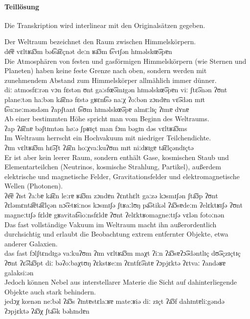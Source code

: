 
\paragraph*{Teillösung}

Die Transkription wird interlinear mit den Originalsätzen gegeben.

\begin{exe}
  \ex \gll Der Weltraum bezeichnet den Raum zwischen Himmelskörpern.\\
  de͡ɐ vɛltʁa͡ɔm bət͡sa͡ɛçnət deːn ʁa͡ɔm t͡svɪʃən hɪməlskœ͡əpɐn\\
  \ex \gll Die Atmosphären von festen und gasförmigen Himmelskörpern (wie Sternen und Planeten) haben keine feste Grenze nach oben, sondern werden mit zunehmendem Abstand zum Himmelskörper allmählich immer dünner.\\
  diː atmosfɛːrən vɔn fɛstən ʊnt gaːsfœ͡əmɪgən hɪməlskœ͡əpɐn viː ʃtɛ͡ənən ʔʊnt planeːtən haːbən ka͡ɛnə fɛstə gʁɛnt͡sə naːχ ʔoːbən zɔndɐn vɛ͡ədən mɪt t͡suːneːməndəm ʔapʃtant t͡sʊm hɪməlskœ͡əpɐ almɛːlɪç ʔɪmɐ dʏnɐ\\
  \ex \gll Ab einer bestimmten Höhe spricht man vom Beginn des Weltraums.\\
  ʔap ʔa͡ɛnɐ bəʃtɪmtən høːə ʃpʁɪçt man fɔm bəgɪn dəs vɛltʁa͡ɔms\\
  \ex \gll Im Weltraum herrscht ein Hochvakuum mit niedriger Teilchendichte.\\
  ʔɪm vɛltʁa͡ɔm hɛ͡əʃt ʔa͡ɛn hoːχvaːkuʔʊm mɪt niːdʁɪgɐ ta͡ɛlçəndɪçtə\\
  \ex \gll Er ist aber kein leerer Raum, sondern enthält Gase, kosmischen Staub und Elementarteilchen (Neutrinos, kosmische Strahlung, Partikel), außerdem elektrische und magnetische Felder, Gravitationsfelder und elektromagnetische Wellen (Photonen).\\
  ʔe͡ɐ ʔɪst ʔaːbɐ ka͡ɛn leːrɐ ʁa͡ɔm zɔndɐn ʔɛnthɛlt gaːzə kɔsmɪʃən ʃta͡ɔp ʔʊnt ʔɛləmɛnta͡ɐta͡ɛlçən nɔ͡œtʁiːnos kɔsmɪʃə ʃtʁaːlʊŋ pa͡ətikəl ʔa͡ɔsɐdeːm ʔelɛktʁɪʃə ʔʊnt magneːtɪʃə fɛldɐ gʁavitat͡sioːnsfɛldɐ ʔʊnt ʔelɛktʁomagneːtɪʃə vɛlən fotoːnən\\
  \ex \gll Das fast vollständige Vakuum im Weltraum macht ihn außerordentlich durchsichtig und erlaubt die Beobachtung extrem entfernter Objekte, etwa anderer Galaxien.\\
  das fast fɔlʃtɛndɪgə vaːkuʔʊm ʔɪm vɛltʁa͡ɔm maχt ʔiːn ʔa͡ɔsɐʔɔ͡ədəntlɪç dʊ͡əçzɪçtɪç ʔʊnt ʔɛ͡əla͡ɔpt diː bəʔoːbaχtʊŋ ʔɛkstʁeːm ʔɛntfɛ͡əntɐ ʔɔpjɛktə ʔɛtvaː ʔandəʁɐ galaksiːən\\
  \ex \gll Jedoch können Nebel aus interstellarer Materie die Sicht auf dahinterliegende Objekte auch stark behindern.\\
  jedɔχ kœnən neːbəl ʔa͡ɔs ʔɪntɐstɛlaːʁɐ mateːʁiə diː zɪçt ʔa͡ɔf dahɪntɐliːgəndə ʔɔpjɛktə ʔa͡ɔχ ʃta͡ək bəhɪndɐn\\
\end{exe}
